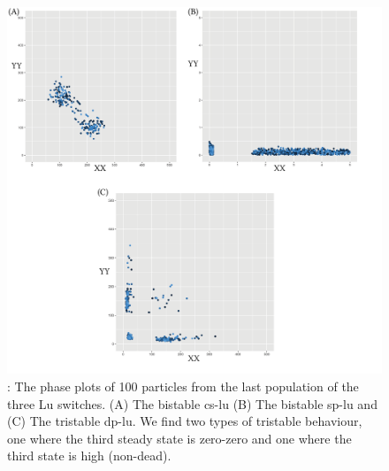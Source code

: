\begin{figure}[p]
\begin{center}
\includegraphics[width=\textwidth]{../../chapters/chapterStabilityFinder/images/lu_paper_phase.png}
\caption[Resulting phase plots from StabilityFinder used on the Lu switches ]{ \label{fig:lu_paper_phase}: The phase plots of 100 particles from the last population of the three Lu switches. (A) The bistable \acrshort{cs-lu} (B) The bistable \acrshort{sp-lu} and (C) The tristable \acrshort{dp-lu}. We find two types of tristable behaviour, one where the third steady state is zero-zero and one where the third state is high (non-dead). }
\end{center}
\end{figure}
\clearpage

